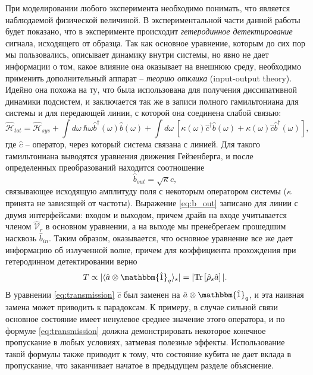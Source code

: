 \documentclass[12pt, twoside]{report}
\newcommand{\Tr}[1]{\text{Tr}\left[#1\right]}
\numberwithin{equation}{section}
\numberwithin{figure}{section}
\begin{document}
При моделировании любого эксперимента необходимо понимать, что является наблюдаемой физической величиной. В экспериментальной части данной работы будет показано, что в эксперименте происходит \textit{гетеродинное детектирование} сигнала, исходящего от образца. Так как основное уравнение, которым до сих пор мы пользовались, описывает динамику внутри системы, но явно не дает информации о том, какое влияние она оказывает на внешнюю среду, необходимо применить дополнительный аппарат -- \textit{теорию отклика}\cite{Bishop2010, clerk2010, gardiner1985} (input-output theory). Идейно она похожа на ту, что была использована для получения диссипативной динамики подсистем, и заключается так же в записи полного гамильтониана для системы и для передающей линии, с которой она соединена слабой связью:
$$\mathcal{\hat H}_{tot} = \mathcal{\hat H}_{sys} +\int d\omega\ \hbar \omega \hat b^\dag(\omega) \hat b(\omega) + \int d\omega\ [ \kappa(\omega) \hat c^{\dag} \hat b(\omega) + \kappa(\omega)\hat c \hat b^{\dag}(\omega)],	$$ 
где $\hat c$ -- оператор, через который система связана с линией. Для такого гамильтониана выводятся уравнения движения Гейзенберга, и после определенных преобразований находится соотношение 
\begin{equation}
\hat b_{out} = \sqrt{\kappa}\hat c,
\label{eq:b_out}
\end{equation} 
связывающее исходящую амплитуду поля с некоторым оператором системы ($\kappa$ принята не зависящей от частоты). Выражение \eqref{eq:b_out} записано для линии с двумя интерфейсами: входом и выходом, причем драйв на входе учитывается членом $\mathcal{\hat V}_r$ в основном уравнении, а на выходе мы пренебрегаем прошедшим насквозь $\hat b_{in}$. Таким образом, оказывается, что основное уравнение все же дает информацию об излученной волне, причем для коэффициента прохождения при гетеродинном детектировании верно\cite{Bishop2010}
\begin{equation}
T \propto | \langle \hat a \otimes \mathbbm{\hat 1}_q \rangle_{s} | = |\Tr{\hat \rho_s \hat a }|.
\label{eq:transmission}
\end{equation}
В уравнении \eqref{eq:transmission} $\hat c$ был заменен на $\hat a \otimes \mathbbm{\hat 1}_q $, и эта наивная замена может приводить к парадоксам. К примеру, в случае сильной связи основное состояние имеет ненулевое среднее значение этого оператора, и по формуле \eqref{eq:transmission} должна демонстрировать некоторое конечное пропускание в любых условиях, затмевая полезные эффекты. Использование такой формулы также приводит к тому, что состояние кубита не дает вклада в пропускание, что заканчивает начатое в предыдущем разделе объяснение.
\end{document}

